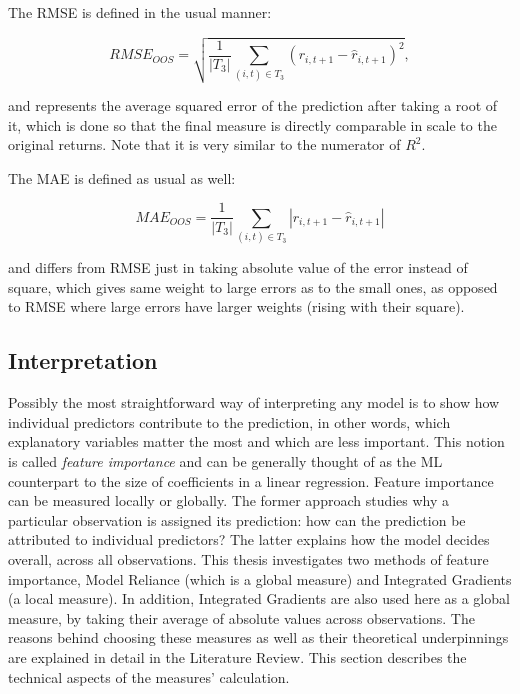 	The RMSE is defined in the usual manner:   
	
	\begin{equation}
		RMSE_{OOS} = \sqrt{ \frac{1}{|T_3|} \sum_{(i,t)\in T_3} \left(r_{i,t+1}-	\hat{r}_{i, t+1}\right) ^2},	
	\end{equation}
	
	and represents the average squared error of the prediction after taking a root of it, which is done so that the final measure is directly comparable in scale to the original returns. Note that it is very similar to the numerator of $R^2$.
	
	The MAE is defined as usual as well: 
	
	\begin{equation}
		MAE_{OOS} = \frac{1}{|T_3|} \sum_{(i,t)\in T_3} |r_{i,t+1}-	\hat{r}_{i, t+1}|
	\end{equation}
	
	and differs from RMSE just in taking absolute value of the error instead of square, which gives same weight to large errors as to the small ones, as opposed to RMSE where large errors have larger weights (rising with their square). 
	
	
	\subsection{Interpretation}
	
	Possibly the most straightforward way of interpreting any model is to show how individual predictors contribute to the prediction, in other words, which explanatory variables matter the most and which are less important. This notion is called \textit{feature importance} and can be generally thought of as the ML counterpart to the size of coefficients in a linear regression. Feature importance can be measured locally or globally. The former approach studies why a particular observation is assigned its prediction: how can the prediction be attributed to individual predictors? The latter explains how the model decides overall, across all observations. This thesis investigates two methods of feature importance, Model Reliance \citep{fisher2019all} (which is a global measure) and Integrated Gradients \citep{sundararajan2017axiomatic} (a local measure). In addition, Integrated Gradients are also used here as a global measure, by taking their average of absolute values across observations. The reasons behind choosing these measures as well as their theoretical underpinnings are explained in detail in the Literature Review. This section describes the technical aspects of the measures' calculation.
	
